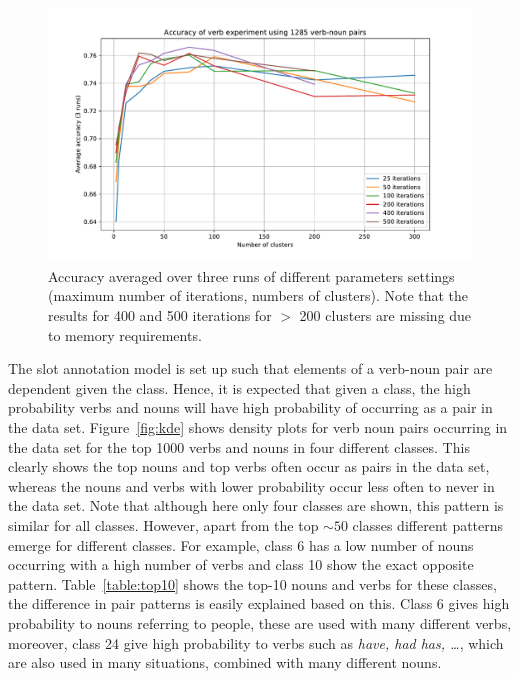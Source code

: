 \documentclass[11pt]{scrartcl}
\begin{document}
\begin{figure}
\includegraphics[width=\textwidth]{slotresults.pdf}
\caption{Accuracy averaged over three runs of different parameters
settings (maximum number of iterations, numbers of clusters). Note
that the results for 400 and 500 iterations for $>$ 200 clusters are
missing due to memory requirements.}
\label{fig:accuracy}
\end{figure}

The slot annotation model is set up such that elements of a verb-noun
pair are dependent given the class. Hence, it is expected that given a
class, the high probability verbs and nouns will have high probability
of occurring as a pair in the data set. Figure~\ref{fig:kde} shows
density plots for verb noun pairs occurring in the data set for the
top 1000 verbs and nouns in four different classes. This clearly shows
the top nouns and top verbs often occur as pairs in the data set,
whereas the nouns and verbs with lower probability occur less often to
never in the data set. Note that although here only four classes are
shown, this pattern is similar for all classes. However, apart from
the top $\sim 50$ classes different patterns emerge for different
classes. For example, class 6 has a low number of nouns occurring with
a high number of verbs and class 10 show the exact opposite pattern.
Table~\ref{table:top10} shows the top-10 nouns and verbs for these
classes, the difference in pair patterns is easily explained based on
this. Class 6 gives high probability to nouns referring to people,
these are used with many different verbs, moreover, class 24 give high
probability to verbs such as \textit{have, had has, \ldots}, which are
also used in many situations, combined with many different nouns.
\end{document}
